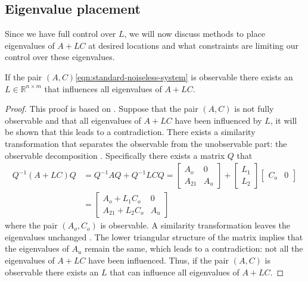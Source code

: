 \subsection{Eigenvalue placement}
Since we have full control over $L$, we will now discuss methods to place eigenvalues of $A+LC$ at desired locations and what constraints are limiting our control over these eigenvalues.

\begin{theorem}
\label{th:arbitrary-alc-eigenvalues}
    If the pair $(A,C)$\eqref{eqn:standard-noiseless-system} is observable there exists an $L \in \mathbb{R}^{n \times m}$ that influences all eigenvalues of $A+LC$.
\end{theorem}
\begin{proof}
    This proof is based on \cite[Section 4.2]{Antsaklis2006LinearSystems}. Suppose that the pair $(A,C)$ is not fully observable and that all eigenvalues of $A+LC$  have been influenced by $L$, it will be shown that this leads to a contradiction. There exists a similarity transformation that separates the observable from the unobservable part: the observable decomposition \cite[Section 16.1]{Hespanha2018LinearTheory}. Specifically there exists a matrix $Q$ that
    \begin{equation}
    \begin{split}
        Q^{-1}(A+LC)Q 
        &= Q^{-1}AQ + Q^{-1}LCQ =
        \begin{bmatrix}
            A_o & 0 \\
            A_{21} & A_u
        \end{bmatrix}
        + 
        \begin{bmatrix}
            L_1 \\
            L_2
        \end{bmatrix}
        \begin{bmatrix}
            C_o & 0
        \end{bmatrix} \\
        &=
        \begin{bmatrix}
            A_o + L_1 C_o & 0 \\
            A_{21} + L_2 C_o & A_u
        \end{bmatrix}
    \end{split}
    \end{equation}  
where the pair $(A_o,C_o)$ is observable. A similarity transformation leaves the eigenvalues unchanged \cite[Section 5.2]{Lay2016LinearApplications}. The lower triangular structure of the matrix implies that the eigenvalues of $A_u$ remain the same, which leads to a contradiction: not all the eigenvalues of $A+LC$ have been influenced. Thus, if the pair $(A,C)$ is observable there exists an $L$ that can influence all eigenvalues of $A+LC$.
\end{proof}

